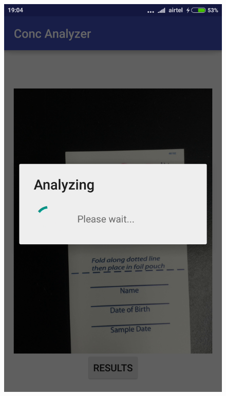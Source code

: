 \documentclass[runningheads,a4paper]{llncs}
\begin{document}
\begin{figure}[h!]
\begin{center}
\includegraphics[scale=0.12]{conc3}

\end{center}
\end{figure}
\end{document}
